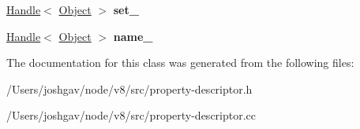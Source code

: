 \begin{DoxyCompactItemize}
\item 
\hyperlink{classv8_1_1internal_1_1_handle}{Handle}$<$ \hyperlink{classv8_1_1internal_1_1_object}{Object} $>$ {\bfseries set\+\_\+}\hypertarget{classv8_1_1internal_1_1_property_descriptor_af7f6b874746b010666d5d02c23473bee}{}\label{classv8_1_1internal_1_1_property_descriptor_af7f6b874746b010666d5d02c23473bee}

\item 
\hyperlink{classv8_1_1internal_1_1_handle}{Handle}$<$ \hyperlink{classv8_1_1internal_1_1_object}{Object} $>$ {\bfseries name\+\_\+}\hypertarget{classv8_1_1internal_1_1_property_descriptor_aec06e3ca8b12170b8700762b6c1c1716}{}\label{classv8_1_1internal_1_1_property_descriptor_aec06e3ca8b12170b8700762b6c1c1716}

\end{DoxyCompactItemize}


The documentation for this class was generated from the following files\+:\begin{DoxyCompactItemize}
\item 
/\+Users/joshgav/node/v8/src/property-\/descriptor.\+h\item 
/\+Users/joshgav/node/v8/src/property-\/descriptor.\+cc\end{DoxyCompactItemize}
